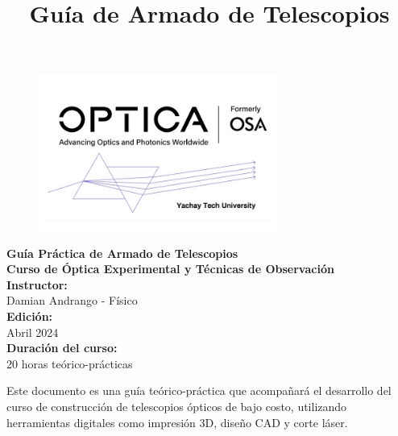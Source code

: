 \documentclass[12pt, twoside]{book}
\title{Guía de Armado de Telescopios}
\newcommand\mymaintitlesize{\fontsize{16pt}{19.2pt}\selectfont}
\newcommand\mysubtitlesize{\fontsize{14pt}{16.8pt}\selectfont}
\begin{document}
	
	\thispagestyle{empty}
	\begin{center}
		\begin{figure}[h]
			\centering
			\includegraphics[width=0.7\textwidth]{logo_invertido}
		\end{figure}
		\vspace*{1cm}
		
		{\mymaintitlesize\textbf{Guía Práctica de Armado de Telescopios}}\\
		\vspace{1cm}
		{\mysubtitlesize\textbf{Curso de Óptica Experimental y Técnicas de Observación}}\\
		\vspace{2cm}
		{\mysubtitlesize\textbf{Instructor:}\\
			Damian Andrango - Físico\\
			\vspace{1cm}
			\textbf{Edición:}\\
			Abril 2024\\
			\vspace{1cm}
			\textbf{Duración del curso:}\\
			20 horas teórico-prácticas}
	\end{center}
	\clearpage
	
	\frontmatter
	
	\tableofcontents
	\cleardoublepage
	
	\mainmatter
	
	
	Este documento es una guía teórico-práctica que acompañará el desarrollo del curso de construcción de telescopios ópticos de bajo costo, utilizando herramientas digitales como impresión 3D, diseño CAD y corte láser.
	
\end{document}

